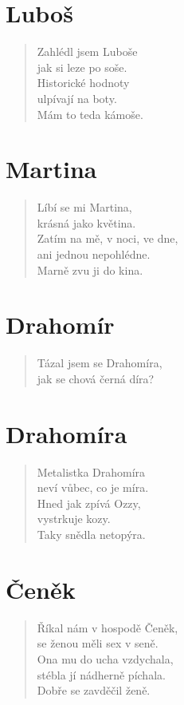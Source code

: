 \section*{Luboš}
\begin{verse}
Zahlédl jsem Luboše\\
jak si leze po soše.\\
Historické hodnoty\\
ulpívají na boty.\\
Mám to teda kámoše.
\end{verse}    

\section*{Martina}
\begin{verse}
Líbí se mi Martina,\\
krásná jako květina.\\
Zatím na mě, v noci, ve dne,\\
ani jednou nepohlédne.\\
Marně zvu ji do kina.
\end{verse}    

\section*{Drahomír}
\begin{verse}
Tázal jsem se Drahomíra,\\
jak se chová černá díra?\\
\end{verse}    

\section*{Drahomíra}
\begin{verse}
Metalistka Drahomíra\\
neví vůbec, co je míra.\\
Hned jak zpívá Ozzy,\\
vystrkuje kozy.\\
Taky snědla netopýra.
\end{verse}    

\section*{Čeněk}
\begin{verse}
Říkal nám v hospodě Čeněk,\\
se ženou měli sex v seně.\\
Ona mu do ucha vzdychala,\\
stébla jí nádherně píchala.\\
Dobře se zavděčil ženě.
\end{verse}    

